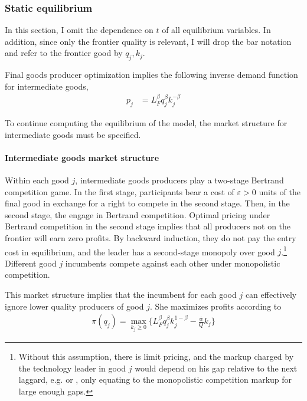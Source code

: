 \documentclass[11pt,english]{article}
\theoremstyle{remark}
\begin{document}
\subsubsection{Static equilibrium}

In this section, I omit the dependence on $t$ of all equilibrium variables. In addition, since only the frontier quality is relevant, I will drop the bar notation and refer to the frontier good by $q_j, k_j$.

Final goods producer optimization implies the following inverse demand function for intermediate goods, 
\begin{align*}
p_j &= L_F^{\beta} q_j^{\beta} k_j^{-\beta}	
\end{align*}

To continue computing the equilibrium of the model, the market structure for intermediate goods must be specified. 

\paragraph{Intermediate goods market structure} Within each good $j$, intermediate goods producers play a two-stage Bertrand competition game. In the first stage, participants bear a cost of $\varepsilon > 0$ units of the final good in exchange for a right to compete in the second stage. Then, in the second stage, the engage in Bertrand competition. Optimal pricing under Bertrand competition in the second stage implies that all producers not on the frontier will earn zero profits. By backward induction, they do not pay the entry cost in equilibrium, and the leader has a second-stage monopoly over good $j$.\footnote{Without this assumption, there is limit pricing, and the markup charged by the technology leader in good $j$ would depend on his gap relative to the next laggard, e.g. \cite{baslandze_spinout_2019} or \cite{aghion_competition_2005}, only equating to the monopolistic competition markup for large enough gaps.} Different good $j$ incumbents compete against each other under monopolistic competition.

This market structure implies that the incumbent for each good $j$ can effectively ignore lower quality producers of good $j$. She maximizes profits according to
\begin{align}
\pi(q_j) = \max_{k_j \ge 0} \Big\{ L_F^{\beta} q_j^{\beta} k_j^{1-\beta} - \frac{\overline{w}}{Q} k_j \Big\} \label{incumbent_profit}
\end{align}
\end{document}
